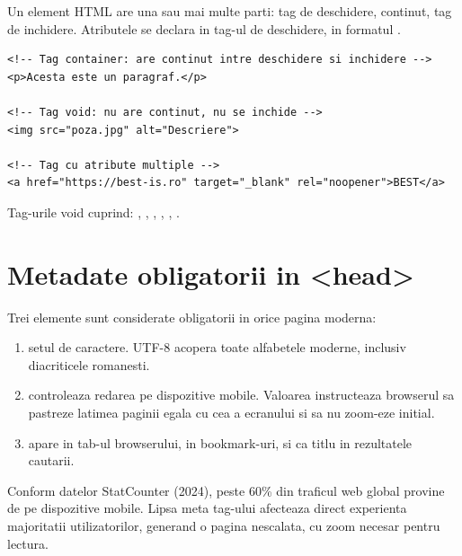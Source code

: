 Un element HTML are una sau mai multe parti: tag de deschidere, continut, tag de inchidere. Atributele se declara in tag-ul de deschidere, in formatul .

\begin{lstlisting}[style=html, caption={Tipuri de tag-uri}]
<!-- Tag container: are continut intre deschidere si inchidere -->
<p>Acesta este un paragraf.</p>

<!-- Tag void: nu are continut, nu se inchide -->
<img src="poza.jpg" alt="Descriere">

<!-- Tag cu atribute multiple -->
<a href="https://best-is.ro" target="_blank" rel="noopener">BEST</a>
\end{lstlisting}

Tag-urile void cuprind: , , , , , .

\section{Metadate obligatorii in <head>}

Trei elemente sunt considerate obligatorii in orice pagina moderna:

\begin{enumerate}
  \item {} \textendash{} setul de caractere. UTF-8 acopera toate alfabetele moderne, inclusiv diacriticele romanesti.
  \item {} \textendash{} controleaza redarea pe dispozitive mobile. Valoarea  instructeaza browserul sa pastreze latimea paginii egala cu cea a ecranului si sa nu zoom-eze initial.
  \item {} \textendash{} apare in tab-ul browserului, in bookmark-uri, si ca titlu in rezultatele cautarii.
\end{enumerate}

\begin{atentie}
Conform datelor StatCounter (2024), peste 60\% din traficul web global provine de pe dispozitive mobile. Lipsa meta tag-ului  afecteaza direct experienta majoritatii utilizatorilor, generand o pagina nescalata, cu zoom necesar pentru lectura.
\end{atentie}

